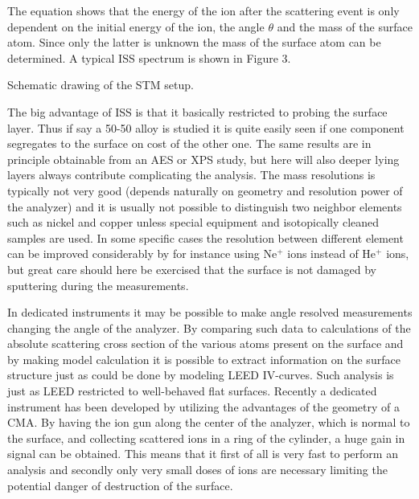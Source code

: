 The equation shows that the energy of the ion after  the scattering event is only dependent on the initial energy of the ion, the angle $\theta$ and the mass of the surface atom. Since only the latter is unknown the mass of the surface atom can be determined. A typical ISS spectrum is shown in Figure 3. 

\vspace*{11cm}

 Schematic drawing of the STM setup.

\vspace{1cm}


 The big advantage of ISS is that it basically restricted to probing the surface layer. Thus if  say  a 50-50 alloy is studied it is quite easily seen if one component segregates to the surface on cost of the other one. The same results are in principle obtainable from an AES or XPS study, but here will also deeper lying layers always contribute complicating the analysis. The mass resolutions is typically not very good (depends naturally on geometry and resolution power of the analyzer) and it is usually not possible to distinguish two neighbor elements such as nickel and copper unless special equipment and isotopically cleaned samples are used. In some specific cases the resolution between different element can be improved considerably by for instance using Ne$^{+}$ ions instead of He$^{+}$ ions, but great care should here be exercised that the surface is not damaged by sputtering during the measurements.

 In dedicated instruments it may be possible to make angle resolved measurements changing the  angle of the analyzer. By comparing such data to calculations of the absolute scattering cross section of the various atoms present on the surface and by making model calculation it is possible to extract information on the surface structure  just as could be done by modeling LEED IV-curves. Such  analysis is just as LEED restricted to well-behaved flat surfaces. Recently a dedicated instrument has been developed by  \cite{Brongersma} utilizing the advantages of the geometry of a CMA. By having the ion gun along the center of the analyzer, which is normal to the surface, and collecting scattered ions in a ring  of the cylinder, a huge gain in signal can be obtained. This means that it first of all is very fast to perform an analysis and secondly only very small doses of ions are necessary limiting the potential danger of destruction of the surface.

